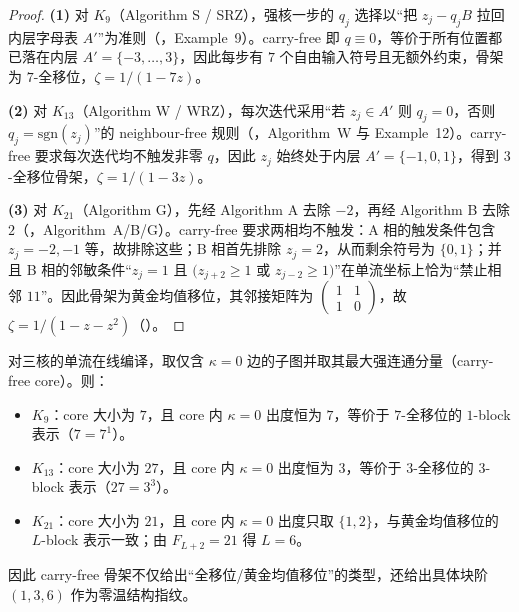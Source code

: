 \begin{proof}
\textbf{(1)} 对 $K_9$（Algorithm S / SRZ），强核一步的 $q_j$ 选择以“把 $z_j-q_jB$ 拉回内层字母表 $A'$”为准则（\cite{FrougnyHellerPelantovaSvobodovaParallelAlgorithmsSlides}，Example~9）。carry-free 即 $q\equiv 0$，等价于所有位置都已落在内层 $A'=\{-3,\dots,3\}$，因此每步有 $7$ 个自由输入符号且无额外约束，骨架为 $7$-全移位，$\zeta=1/(1-7z)$。

\textbf{(2)} 对 $K_{13}$（Algorithm W / WRZ），每次迭代采用“若 $z_j\in A'$ 则 $q_j=0$，否则 $q_j=\mathrm{sgn}(z_j)$”的 neighbour-free 规则（\cite{FrougnyHellerPelantovaSvobodovaParallelAlgorithmsSlides}，Algorithm~W 与 Example~12）。carry-free 要求每次迭代均不触发非零 $q$，因此 $z_j$ 始终处于内层 $A'=\{-1,0,1\}$，得到 $3$-全移位骨架，$\zeta=1/(1-3z)$。

\textbf{(3)} 对 $K_{21}$（Algorithm G），先经 Algorithm A 去除 $-2$，再经 Algorithm B 去除 $2$（\cite{FrougnyHellerPelantovaSvobodovaParallelAlgorithmsSlides}，Algorithm~A/B/G）。carry-free 要求两相均不触发：A 相的触发条件包含 $z_j=-2,-1$ 等，故排除这些；B 相首先排除 $z_j=2$，从而剩余符号为 $\{0,1\}$；并且 B 相的邻敏条件“$z_j=1$ 且 $(z_{j+2}\ge 1$ 或 $z_{j-2}\ge 1)$”在单流坐标上恰为“禁止相邻 $11$”。因此骨架为黄金均值移位，其邻接矩阵为 $\begin{pmatrix}1&1\\1&0\end{pmatrix}$，故 $\zeta=1/(1-z-z^2)$（\cite{LindMarcus1995}）。
\end{proof}

\begin{proposition}\label{prop:carry-free-core-block}
对三核的单流在线编译，取仅含 $\kappa=0$ 边的子图并取其最大强连通分量（carry-free core）。则：
\begin{itemize}
  \item $K_9$：core 大小为 $7$，且 core 内 $\kappa=0$ 出度恒为 $7$，等价于 $7$-全移位的 $1$-block 表示（$7=7^1$）。
  \item $K_{13}$：core 大小为 $27$，且 core 内 $\kappa=0$ 出度恒为 $3$，等价于 $3$-全移位的 $3$-block 表示（$27=3^3$）。
  \item $K_{21}$：core 大小为 $21$，且 core 内 $\kappa=0$ 出度只取 $\{1,2\}$，与黄金均值移位的 $L$-block 表示一致；由 $F_{L+2}=21$ 得 $L=6$。
\end{itemize}
因此 carry-free 骨架不仅给出“全移位/黄金均值移位”的类型，还给出具体块阶 $(1,3,6)$ 作为零温结构指纹。
\end{proposition}

